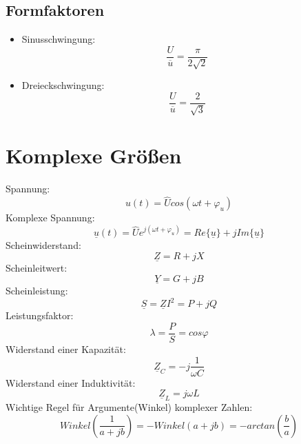 \documentclass[12pt,a4paper]{article}
\begin{document}
\subsection{Formfaktoren}
\begin{itemize}
\item Sinusschwingung:
\[\frac{U}{\overline{u}} = \frac{\pi}{2\sqrt{2}}\]
\item Dreieckschwingung: 
\[\frac{U}{\overline{u}} = \frac{2}{\sqrt{3}}\]
\end{itemize}

\section{Komplexe Größen}
Spannung:
\[u(t) = \hat{U} cos(\omega t +\varphi_u)\]
Komplexe Spannung:
\[\underline{u}(t) = \hat{U}e^{j(\omega t +\varphi_u)} = Re\{\underline{u}\} + j Im\{\underline{u}\}\]
Scheinwiderstand:
\[\underline{Z} = R + jX\]
Scheinleitwert:
\[\underline{Y} = G + jB\]
Scheinleistung:
\[\underline{S} = \underline{Z}I^2 = P + jQ\]
Leistungsfaktor:
\[\lambda = \frac{P}{S}=cos\varphi\]
Widerstand einer Kapazität:
\[\underline{Z}_C = -j\frac{1}{\omega C}\]
Widerstand einer Induktivität:
\[\underline{Z}_L = j\omega L\]
Wichtige Regel für Argumente(Winkel) komplexer Zahlen:
\[Winkel(\frac{1}{a+jb}) = -Winkel(a+jb) = -arctan(\frac{b}{a})\]

\section{Filter}
\subsection{Formeln}
\[1dB = 10lg\frac{P_A}{P_E} = 20lg \frac{U_A}{U_E}\]

\subsection{Tiefpass 1.Grades}
\[\frac{U_A}{U_E} = \frac{1}{\sqrt{1+j\Omega ^2}}\]
Phasenverschiebung:
\[\varphi = -\arctan(\Omega)\]
Grenzfrequenz:
\[\frac{U_A}{U_E} = \frac{1}{\sqrt(2)} \rightarrow \omega_g = \frac{\Omega_g}{RC} = \frac{1}{RC}\]

\subsection{Tiefpass 2.Grades}
\[\omega_g  = \frac{0,375}{RC}\]

\section{Komplexe Leistung}
\end{document}
